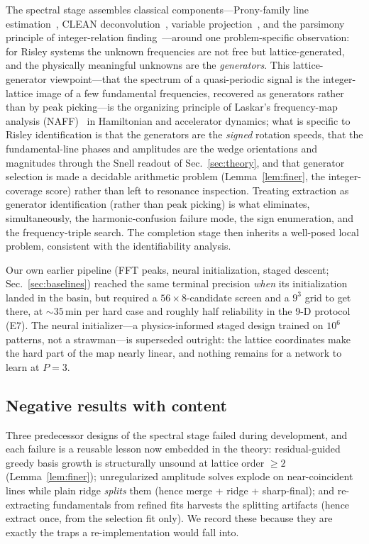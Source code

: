 \documentclass[twocolumn,preprintnumbers,amsmath,amssymb,pra,floatfix]{revtex4-2}
\begin{document}
The spectral stage assembles classical components---Prony-family line
estimation~\cite{HuaSarkar1990,RoyKailath1989}, CLEAN
deconvolution~\cite{Hogbom1974}, variable
projection~\cite{GolubPereyra1973}, and the parsimony principle of
integer-relation finding~\cite{LLL1982}---around one problem-specific
observation: for Risley systems the unknown frequencies are not free
but lattice-generated, and the physically meaningful unknowns are the
\emph{generators}.  This lattice-generator viewpoint---that the spectrum
of a quasi-periodic signal is the integer-lattice image of a few
fundamental frequencies, recovered as generators rather than by peak
picking---is the organizing principle of Laskar's frequency-map analysis
(NAFF)~\cite{Laskar1990,Laskar1993} in Hamiltonian and accelerator
dynamics; what is specific to Risley identification is that the
generators are the \emph{signed} rotation speeds, that the
fundamental-line phases and amplitudes are the wedge orientations and
magnitudes through the Snell readout of Sec.~\ref{sec:theory}, and that
generator selection is made a decidable arithmetic problem
(Lemma~\ref{lem:finer}, the integer-coverage score) rather than left to
resonance inspection.  Treating extraction as generator identification
(rather than peak picking) is what eliminates, simultaneously, the
harmonic-confusion failure mode, the sign enumeration, and the
frequency-triple search.  The completion stage then inherits a
well-posed local problem, consistent with the identifiability analysis.

Our own earlier pipeline (FFT peaks, neural initialization, staged
descent; Sec.~\ref{sec:baselines}) reached the same terminal precision
\emph{when} its initialization landed in the basin, but required a
$56\times8$-candidate screen and a $9^3$ grid to get there, at
$\sim\!35$\,min per hard case and roughly half reliability in the 9-D
protocol (E7).  The neural initializer---a physics-informed staged design
trained on $10^{6}$ patterns, not a strawman---is superseded outright:
the lattice coordinates make the hard part of the map nearly linear,
and nothing remains for a network to learn at $P{=}3$.

\subsection{Negative results with content}

Three predecessor designs of the spectral stage failed during
development, and each failure is a reusable lesson now embedded in the
theory: residual-guided greedy basis growth is structurally unsound at
lattice order $\ge2$ (Lemma~\ref{lem:finer}); unregularized amplitude
solves explode on near-coincident lines while plain ridge
\emph{splits} them (hence merge + ridge + sharp-final); and
re-extracting fundamentals from refined fits harvests the splitting
artifacts (hence extract once, from the selection fit only).  We record
these because they are exactly the traps a re-implementation would
fall into.
\end{document}
